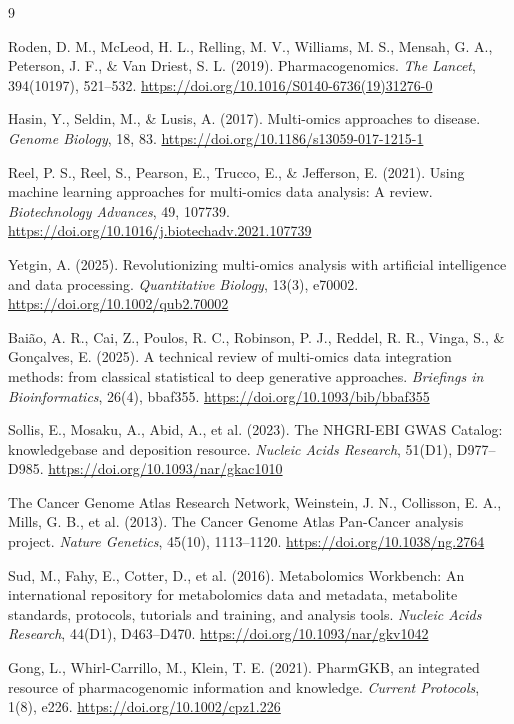 \documentclass[11pt]{article}
\begin{document}
\begin{thebibliography}{9}

Roden, D. M., McLeod, H. L., Relling, M. V., Williams, M. S., Mensah, G. A., Peterson, J. F., \& Van Driest, S. L. (2019). Pharmacogenomics. \textit{The Lancet}, 394(10197), 521--532. \url{https://doi.org/10.1016/S0140-6736(19)31276-0}

Hasin, Y., Seldin, M., \& Lusis, A. (2017). Multi-omics approaches to disease. \textit{Genome Biology}, 18, 83. \url{https://doi.org/10.1186/s13059-017-1215-1}

Reel, P. S., Reel, S., Pearson, E., Trucco, E., \& Jefferson, E. (2021). Using machine learning approaches for multi-omics data analysis: A review. \textit{Biotechnology Advances}, 49, 107739. \url{https://doi.org/10.1016/j.biotechadv.2021.107739}

Yetgin, A. (2025). Revolutionizing multi-omics analysis with artificial intelligence and data processing. \textit{Quantitative Biology}, 13(3), e70002. \url{https://doi.org/10.1002/qub2.70002}

Baião, A. R., Cai, Z., Poulos, R. C., Robinson, P. J., Reddel, R. R., Vinga, S., \& Gonçalves, E. (2025). A technical review of multi-omics data integration methods: from classical statistical to deep generative approaches. \textit{Briefings in Bioinformatics}, 26(4), bbaf355. \url{https://doi.org/10.1093/bib/bbaf355}

Sollis, E., Mosaku, A., Abid, A., et al. (2023). The NHGRI-EBI GWAS Catalog: knowledgebase and deposition resource. \textit{Nucleic Acids Research}, 51(D1), D977--D985. \url{https://doi.org/10.1093/nar/gkac1010}

The Cancer Genome Atlas Research Network, Weinstein, J. N., Collisson, E. A., Mills, G. B., et al. (2013). The Cancer Genome Atlas Pan-Cancer analysis project. \textit{Nature Genetics}, 45(10), 1113--1120. \url{https://doi.org/10.1038/ng.2764}

Sud, M., Fahy, E., Cotter, D., et al. (2016). Metabolomics Workbench: An international repository for metabolomics data and metadata, metabolite standards, protocols, tutorials and training, and analysis tools. \textit{Nucleic Acids Research}, 44(D1), D463--D470. \url{https://doi.org/10.1093/nar/gkv1042}

Gong, L., Whirl-Carrillo, M., Klein, T. E. (2021). PharmGKB, an integrated resource of pharmacogenomic information and knowledge. \textit{Current Protocols}, 1(8), e226. \url{https://doi.org/10.1002/cpz1.226}

\end{thebibliography}
\end{document}
